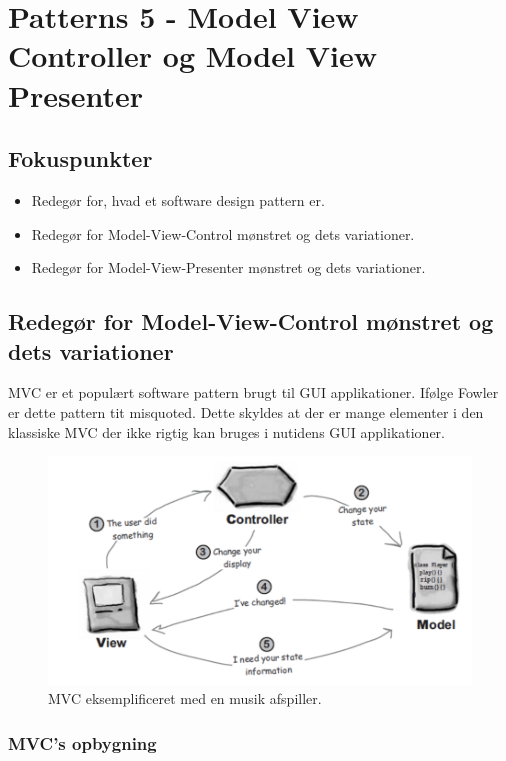 \section{Patterns 5 - Model View Controller og Model View Presenter}

\subsection{Fokuspunkter}

\begin{itemize}
	\item Redegør for, hvad et software design pattern er.
	\item Redegør for Model-View-Control mønstret og dets variationer.
	\item Redegør for Model-View-Presenter mønstret og dets variationer.
\end{itemize}




\subsection{Redegør for Model-View-Control mønstret og dets variationer}
MVC er et populært software pattern brugt til GUI applikationer. Ifølge Fowler er dette pattern tit misquoted. Dette skyldes at der er mange elementer i den klassiske MVC der ikke rigtig kan bruges i nutidens GUI applikationer.

\begin{figure}[H]
	\centering
	\includegraphics[width=0.8\linewidth]{figs/mvcExample}
	\caption{MVC eksemplificeret med en musik afspiller.}
	\label{fig:mvcExample}
\end{figure}

\subsubsection{MVC's opbygning}

